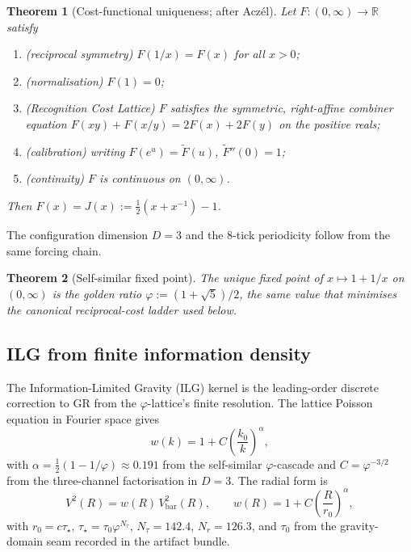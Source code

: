 \documentclass[11pt,a4paper]{article}
\theoremstyle{plain}
\newtheorem{theorem}{Theorem}
\theoremstyle{definition}
\begin{document}
\begin{theorem}[Cost-functional uniqueness; after Acz\'el]
\label{thm:Junique}
Let $F : (0,\infty) \to \mathbb{R}$ satisfy
\begin{enumerate}\itemsep0pt
\item (reciprocal symmetry) $F(1/x) = F(x)$ for all $x > 0$;
\item (normalisation) $F(1) = 0$;
\item (Recognition Cost Lattice) $F$ satisfies the symmetric, right-affine combiner equation $F(xy)+F(x/y) = 2F(x)+2F(y)$ on the positive reals;
\item (calibration) writing $F(e^u) = \tilde{F}(u)$, $\tilde{F}''(0) = 1$;
\item (continuity) $F$ is continuous on $(0,\infty)$.
\end{enumerate}
Then $F(x) = J(x) := \tfrac{1}{2}(x + x^{-1}) - 1$.
\end{theorem}

The configuration dimension $D = 3$ and the 8-tick periodicity follow from the same forcing chain.

\begin{theorem}[Self-similar fixed point]
\label{thm:phi}
The unique fixed point of $x \mapsto 1 + 1/x$ on $(0,\infty)$ is the golden ratio $\varphi := (1+\sqrt{5})/2$, the same value that minimises the canonical reciprocal-cost ladder used below.
\end{theorem}

\subsection{ILG from finite information density}
The Information-Limited Gravity (ILG) kernel is the leading-order discrete correction to GR from the $\varphi$-lattice's finite resolution. The lattice Poisson equation in Fourier space gives
\begin{equation}
w(k) = 1 + C \left( \frac{k_0}{k} \right)^{\alpha},
\end{equation}
with $\alpha = \tfrac{1}{2}(1 - 1/\varphi) \approx 0.191$ from the self-similar $\varphi$-cascade and $C = \varphi^{-3/2}$ from the three-channel factorisation in $D = 3$. The radial form is
\begin{equation}
\label{eq:radial}
V^{2}(R) = w(R) \, V_{\mathrm{bar}}^{2}(R), \qquad w(R) = 1 + C \left( \frac{R}{r_{0}} \right)^{\alpha},
\end{equation}
with $r_{0} = c\tau_{\star}$, $\tau_{\star} = \tau_{0}\varphi^{N_{\tau}}$, $N_{\tau} = 142.4$, $N_{r} = 126.3$, and $\tau_{0}$ from the gravity-domain seam recorded in the artifact bundle.
\end{document}
